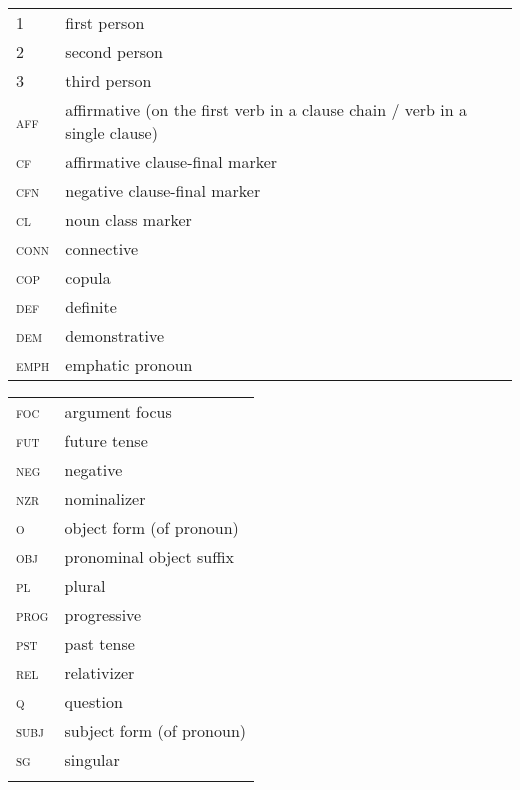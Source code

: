 \documentclass[output=paper]{langsci/langscibook}
\begin{document}
\begin{tabularx}{.55\textwidth}{lQ}
1 &   first person    \\
2 & second person\\
3 & third person\\
\textsc{aff} & affirmative (on the first verb in a clause chain / verb in a single clause)\\
\textsc{cf} &  affirmative clause-final marker\\
\textsc{cfn} & negative clause-final marker\\
\textsc{cl} & noun class marker\\
\textsc{conn} & connective\\
\textsc{cop} & copula\\
\textsc{def} & definite\\
\textsc{dem} & demonstrative\\
\textsc{emph} & emphatic pronoun\\
\end{tabularx}
\begin{tabularx}{.45\textwidth}{lX}
\textsc{foc} & argument focus\\
\textsc{fut} & future tense\\
\textsc{neg} & negative\\
\textsc{nzr} & nominalizer\\
\textsc{o} & object form (of pronoun)\\
\textsc{obj} & pronominal object suffix\\
\textsc{pl} & plural\\
\textsc{prog} & progressive\\
\textsc{pst} & past tense\\
\textsc{rel} & relativizer\\
\textsc{q} & question\\
\textsc{subj} & subject form (of pronoun)\\
\textsc{sg} & singular\\
\\
\end{tabularx}

\printbibliography[heading=subbibliography,notkeyword=this]
\end{document}
